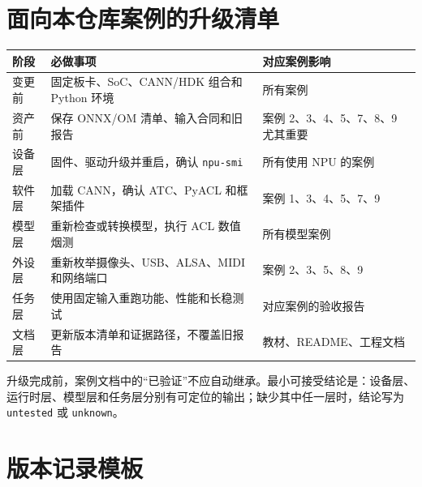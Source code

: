 \section{面向本仓库案例的升级清单}\label{ux9762ux5411ux672cux4ed3ux5e93ux6848ux4f8bux7684ux5347ux7ea7ux6e05ux5355}

\begin{longtable}[]{@{}
  >{\raggedright\arraybackslash}p{}
  >{\raggedright\arraybackslash}p{}
  >{\raggedright\arraybackslash}p{}@{}}
\toprule\noalign{}
\begin{minipage}[b]{\linewidth}\raggedright
阶段
\end{minipage} & \begin{minipage}[b]{\linewidth}\raggedright
必做事项
\end{minipage} & \begin{minipage}[b]{\linewidth}\raggedright
对应案例影响
\end{minipage} \\
\midrule\noalign{}
\endhead
\bottomrule\noalign{}
\endlastfoot
变更前 & 固定板卡、SoC、CANN/HDK 组合和 Python 环境 & 所有案例 \\
资产前 & 保存 ONNX/OM 清单、输入合同和旧报告 & 案例 2、3、4、5、7、8、9
尤其重要 \\
设备层 & 固件、驱动升级并重启，确认 \passthrough{\lstinline!npu-smi!} &
所有使用 NPU 的案例 \\
软件层 & 加载 CANN，确认 ATC、PyACL 和框架插件 & 案例
1、3、4、5、7、9 \\
模型层 & 重新检查或转换模型，执行 ACL 数值烟测 & 所有模型案例 \\
外设层 & 重新枚举摄像头、USB、ALSA、MIDI 和网络端口 & 案例
2、3、5、8、9 \\
任务层 & 使用固定输入重跑功能、性能和长稳测试 & 对应案例的验收报告 \\
文档层 & 更新版本清单和证据路径，不覆盖旧报告 &
教材、README、工程文档 \\
\end{longtable}

升级完成前，案例文档中的``已验证''不应自动继承。最小可接受结论是：设备层、运行时层、模型层和任务层分别有可定位的输出；缺少其中任一层时，结论写为
\passthrough{\lstinline!untested!} 或
\passthrough{\lstinline!unknown!}。

\section{版本记录模板}\label{ux7248ux672cux8bb0ux5f55ux6a21ux677f}

